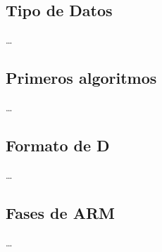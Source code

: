
\subsection{Tipo de Datos}
\ldots




\subsection{Primeros algoritmos}
\ldots





\subsection{Formato de D}
\ldots





\subsection{Fases de ARM}
\ldots
